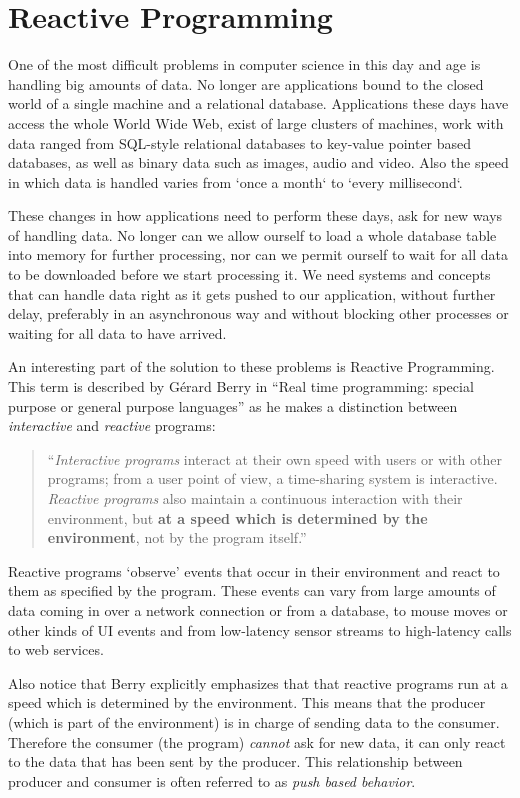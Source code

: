 \section{Reactive Programming}
One of the most difficult problems in computer science in this day and age is handling big amounts of data. No longer are applications bound to the closed world of a single machine and a relational database. Applications these days have access the whole World Wide Web, exist of large clusters of machines, work with data ranged from SQL-style relational databases to key-value pointer based databases, as well as binary data such as images, audio and video. Also the speed in which data is handled varies from `once a month` to `every millisecond`.

These changes in how applications need to perform these days, ask for new ways of handling data. No longer can we allow ourself to load a whole database table into memory for further processing, nor can we permit ourself to wait for all data to be downloaded before we start processing it. We need systems and concepts that can handle data right as it gets pushed to our application, without further delay, preferably in an asynchronous way and without blocking other processes or waiting for all data to have arrived. 

An interesting part of the solution to these problems is Reactive Programming. This term is described by G\'erard Berry in ``Real time programming: special purpose or general purpose languages''  as he makes a distinction between \textit{interactive} and \textit{reactive} programs:

\begin{quote}
``\textit{Interactive programs} interact at their own speed with users or with other programs; from a user point of view, a time-sharing system is interactive. \textit{Reactive programs} also maintain a continuous interaction with their environment, but \textbf{at a speed which is determined by the environment}, not by the program itself.''
\end{quote}

Reactive programs `observe' events that occur in their environment and react to them as specified by the program. These events can vary from large amounts of data coming in over a network connection or from a database, to mouse moves or other kinds of UI events and from low-latency sensor streams to high-latency calls to web services.

Also notice that Berry explicitly emphasizes that that reactive programs run at a speed which is determined by the environment. This means that the producer (which is part of the environment) is in charge of sending data to the consumer. Therefore the consumer (the program) \emph{cannot} ask for new data, it can only react to the data that has been sent by the producer. This relationship between producer and consumer is often referred to as \textit{push based behavior}.

